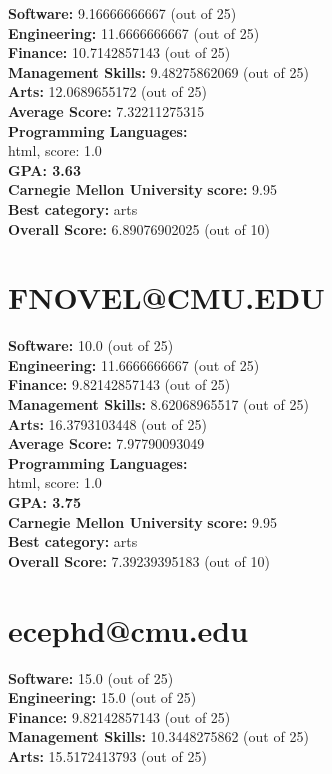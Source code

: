 \documentclass{article}
\begin{document}
\textbf{Software:} 9.16666666667 (out of 25)\\
\textbf{Engineering: } 11.6666666667 (out of 25)\\
\textbf{Finance:} 10.7142857143 (out of 25)\\
\textbf{Management Skills:} 9.48275862069 (out of 25)\\
\textbf{Arts:} 12.0689655172 (out of 25)\\
\textbf{Average Score: } 7.32211275315\\
\textbf{Programming Languages:} \\
html, score: 1.0\\
\textbf{GPA: 3.63}\\
\textbf{Carnegie Mellon University} \textbf{score:} 9.95\\
\textbf{Best category: } arts\\
\textbf{Overall Score: }6.89076902025 (out of 10)\section{FNOVEL@CMU.EDU}
\textbf{Software:} 10.0 (out of 25)\\
\textbf{Engineering: } 11.6666666667 (out of 25)\\
\textbf{Finance:} 9.82142857143 (out of 25)\\
\textbf{Management Skills:} 8.62068965517 (out of 25)\\
\textbf{Arts:} 16.3793103448 (out of 25)\\
\textbf{Average Score: } 7.97790093049\\
\textbf{Programming Languages:} \\
html, score: 1.0\\
\textbf{GPA: 3.75}\\
\textbf{Carnegie Mellon University} \textbf{score:} 9.95\\
\textbf{Best category: } arts\\
\textbf{Overall Score: }7.39239395183 (out of 10)\section{ecephd@cmu.edu}
\textbf{Software:} 15.0 (out of 25)\\
\textbf{Engineering: } 15.0 (out of 25)\\
\textbf{Finance:} 9.82142857143 (out of 25)\\
\textbf{Management Skills:} 10.3448275862 (out of 25)\\
\textbf{Arts:} 15.5172413793 (out of 25)\\
\end{document}
